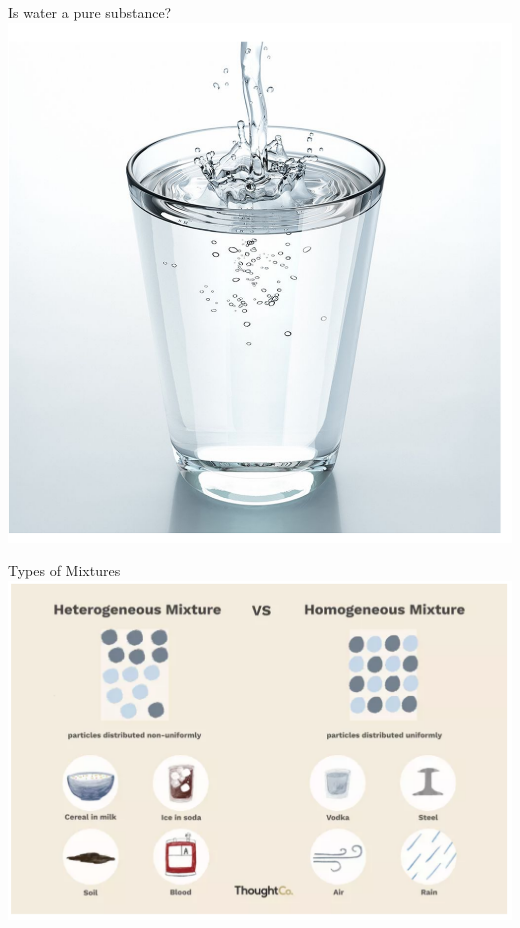 \documentclass[11pt]{beamer}
\begin{document}
\begin{frame}{Is water a pure substance?}
  \centering
  \includegraphics[scale=0.2]{water}
\end{frame}

\begin{frame}{Types of Mixtures}
  \centering
  \includegraphics[width=\linewidth]{mixtures}
\end{frame}
\end{document}
